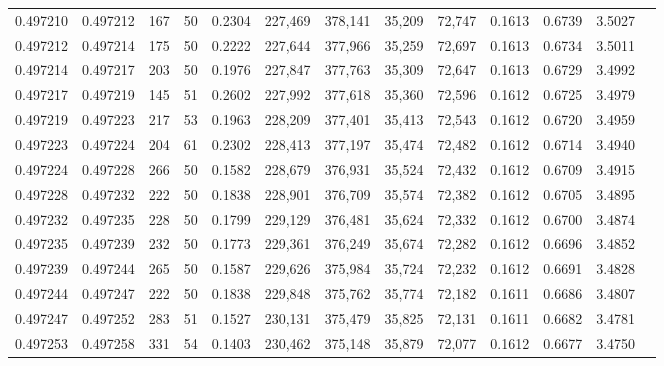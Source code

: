 \begin{tabular}{rrrrrrrrrrrrr}
0.497210 & 0.497212 & 167 &  50 &                                     0.2304 & 227,469 & 378,141 &  35,209 &  72,747 & 0.1613 & 0.6739 & 3.5027 \\
0.497212 & 0.497214 & 175 &  50 &                                     0.2222 & 227,644 & 377,966 &  35,259 &  72,697 & 0.1613 & 0.6734 & 3.5011 \\
0.497214 & 0.497217 & 203 &  50 &                                     0.1976 & 227,847 & 377,763 &  35,309 &  72,647 & 0.1613 & 0.6729 & 3.4992 \\
0.497217 & 0.497219 & 145 &  51 &                                     0.2602 & 227,992 & 377,618 &  35,360 &  72,596 & 0.1612 & 0.6725 & 3.4979 \\
0.497219 & 0.497223 & 217 &  53 &                                     0.1963 & 228,209 & 377,401 &  35,413 &  72,543 & 0.1612 & 0.6720 & 3.4959 \\
0.497223 & 0.497224 & 204 &  61 &                                     0.2302 & 228,413 & 377,197 &  35,474 &  72,482 & 0.1612 & 0.6714 & 3.4940 \\
0.497224 & 0.497228 & 266 &  50 &                                     0.1582 & 228,679 & 376,931 &  35,524 &  72,432 & 0.1612 & 0.6709 & 3.4915 \\
0.497228 & 0.497232 & 222 &  50 &                                     0.1838 & 228,901 & 376,709 &  35,574 &  72,382 & 0.1612 & 0.6705 & 3.4895 \\
0.497232 & 0.497235 & 228 &  50 &                                     0.1799 & 229,129 & 376,481 &  35,624 &  72,332 & 0.1612 & 0.6700 & 3.4874 \\
0.497235 & 0.497239 & 232 &  50 &                                     0.1773 & 229,361 & 376,249 &  35,674 &  72,282 & 0.1612 & 0.6696 & 3.4852 \\
0.497239 & 0.497244 & 265 &  50 &                                     0.1587 & 229,626 & 375,984 &  35,724 &  72,232 & 0.1612 & 0.6691 & 3.4828 \\
0.497244 & 0.497247 & 222 &  50 &                                     0.1838 & 229,848 & 375,762 &  35,774 &  72,182 & 0.1611 & 0.6686 & 3.4807 \\
0.497247 & 0.497252 & 283 &  51 &                                     0.1527 & 230,131 & 375,479 &  35,825 &  72,131 & 0.1611 & 0.6682 & 3.4781 \\
0.497253 & 0.497258 & 331 &  54 &                                     0.1403 & 230,462 & 375,148 &  35,879 &  72,077 & 0.1612 & 0.6677 & 3.4750 \\

\end{tabular}
